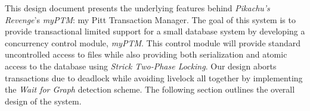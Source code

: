 This design document presents the underlying features behind \textit{Pikachu's Revenge}'s \textit{myPTM}: my Pitt Transaction Manager. The goal of this system is to provide transactional limited support for a small database system by developing a concurrency control module, \textit{myPTM}. This control module will provide standard uncontrolled access to files while also providing both serialization and atomic access to the database using \textit{Strick Two-Phase Locking}. Our design aborts transactions due to deadlock while avoiding livelock all together by implementing the \textit{Wait for Graph} detection scheme. The following section outlines the overall design of the system.